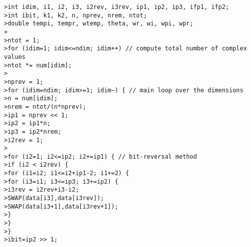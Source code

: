 \texttt{>\quad int idim, i1, i2, i3, i2rev, i3rev, ip1, ip2, ip3, ifp1, ifp2;} \\
\texttt{>\quad int ibit, k1, k2, n, nprev, nrem, ntot;} \\
\texttt{>\quad double tempi, tempr, wtemp, theta, wr, wi, wpi, wpr;} \\
\texttt{>\quad } \\
\texttt{>\quad ntot = 1;} \\
\texttt{>\quad for (idim=1; idim<=ndim; idim++) // compute total number of complex values} \\
\texttt{>\quad \qquad ntot *= num[idim];} \\
\texttt{>\quad } \\
\texttt{>\quad nprev = 1;} \\
\texttt{>\quad for (idim=ndim; idim>=1; idim--) \{ // main loop over the dimensions} \\
\texttt{>\quad \qquad n = num[idim];} \\
\texttt{>\quad \qquad nrem = ntot/(n*nprev);} \\
\texttt{>\quad \qquad ip1 = nprev << 1;} \\
\texttt{>\quad \qquad ip2 = ip1*n;} \\
\texttt{>\quad \qquad ip3 = ip2*nrem;} \\
\texttt{>\quad \qquad i2rev = 1;} \\
\texttt{>\quad } \\
\texttt{>\quad \qquad for (i2=1; i2<=ip2; i2+=ip1) \{ // bit-reversal method} \\
\texttt{>\quad \qquad\qquad if (i2 < i2rev) \{} \\
\texttt{>\quad \qquad\qquad\qquad for (i1=i2; i1<=i2+ip1-2; i1+=2) \{} \\
\texttt{>\quad \qquad\qquad\qquad\qquad for (i3=i1; i3<=ip3; i3+=ip2) \{} \\
\texttt{>\quad \qquad\qquad\qquad\qquad\qquad i3rev = i2rev+i3-i2;} \\
\texttt{>\quad \qquad\qquad\qquad\qquad\qquad SWAP(data[i3],data[i3rev]);} \\
\texttt{>\quad \qquad\qquad\qquad\qquad\qquad SWAP(data[i3+1],data[i3rev+1]);} \\
\texttt{>\quad \qquad\qquad\qquad\qquad \}} \\
\texttt{>\quad \qquad\qquad\qquad \}} \\
\texttt{>\quad \qquad\qquad \}} \\
\texttt{>\quad \qquad\qquad ibit=ip2 >> 1;} \\
